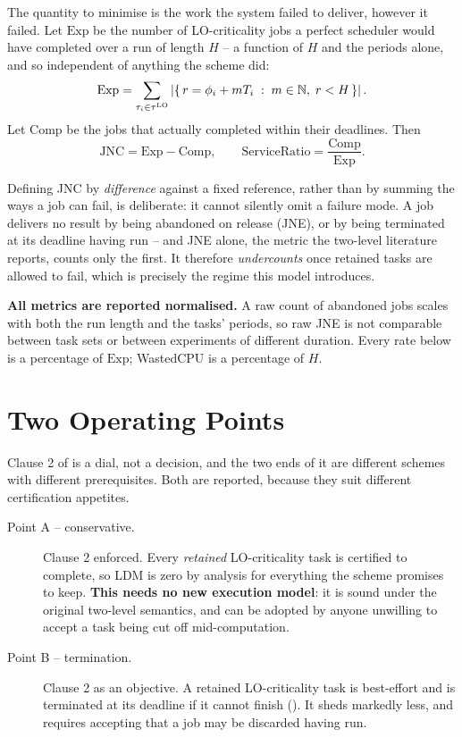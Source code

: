 The quantity to minimise is the work the system failed to deliver, however it
failed. Let $\mathrm{Exp}$ be the number of LO-criticality jobs a perfect
scheduler would have completed over a run of length $H$ -- a function of $H$
and the periods alone, and so independent of anything the scheme did:
\[
\mathrm{Exp} = \sum_{\tau_i \in \tau^{\mathrm{LO}}} \left| \{\, r = \phi_i + m T_i \;:\; m \in \mathbb{N},\; r < H \,\} \right| .
\]
Let $\mathrm{Comp}$ be the jobs that actually completed within their deadlines.
Then
\[
\mathrm{JNC} = \mathrm{Exp} - \mathrm{Comp},
\qquad
\mathrm{ServiceRatio} = \frac{\mathrm{Comp}}{\mathrm{Exp}} .
\]

Defining JNC by \emph{difference} against a fixed reference, rather than by
summing the ways a job can fail, is deliberate: it cannot silently omit a
failure mode. A job delivers no result by being abandoned on release (JNE), or
by being terminated at its deadline having run -- and JNE alone, the metric the
two-level literature reports, counts only the first. It therefore
\emph{undercounts} once retained tasks are allowed to fail, which is precisely
the regime this model introduces.

\textbf{All metrics are reported normalised.} A raw count of abandoned jobs
scales with both the run length and the tasks' periods, so raw JNE is not
comparable between task sets or between experiments of different duration.
Every rate below is a percentage of $\mathrm{Exp}$; WastedCPU is a percentage
of $H$.

\section{Two Operating Points}
\label{sec:operating-points}

Clause 2 of  is a dial, not a decision, and the two
ends of it are different schemes with different prerequisites. Both are
reported, because they suit different certification appetites.

\begin{description}
\item[Point A -- conservative.] Clause 2 enforced. Every \emph{retained}
  LO-criticality task is certified to complete, so LDM is zero by analysis for
  everything the scheme promises to keep. \textbf{This needs no new execution
  model}: it is sound under the original two-level semantics, and can be
  adopted by anyone unwilling to accept a task being cut off mid-computation.
\item[Point B -- termination.] Clause 2 as an objective. A retained
  LO-criticality task is best-effort and is terminated at its deadline if it
  cannot finish (). It sheds markedly less, and requires
  accepting that a job may be discarded having run.
\end{description}

